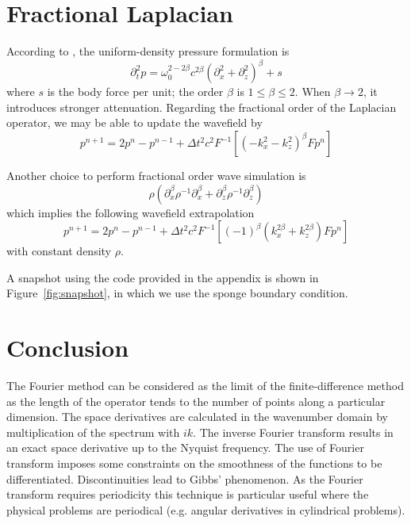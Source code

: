\section{Fractional Laplacian}

According to \cite{Carcione_2010_GFP}, the uniform-density pressure formulation is 
\begin{equation}
 \partial_t^2p =\omega_0^{2-2\beta} c^{2\beta} (\partial_x^2+\partial_z^2)^\beta+s
\end{equation}
where $s$ is the body force per unit; the order $\beta$ is $1\leq \beta\leq 2$. When $\beta\rightarrow 2$, it introduces stronger attenuation. Regarding the fractional order of the Laplacian operator,
we may be able to update the wavefield by
\begin{equation}
p^{n+1}=2p^n-p^{n-1}+\Delta t^2 c^2F^{-1}[(-k_x^2-k_z^2)^\beta F p^n]
\end{equation}



Another choice to perform fractional order wave simulation is
\begin{equation}
 \rho (\partial_x^\beta \rho^{-1}\partial_x^\beta +\partial_z^\beta\rho^{-1}\partial_z^\beta )
\end{equation}
which implies the following wavefield extrapolation
\begin{equation}
p^{n+1}=2p^n-p^{n-1}+\Delta t^2 c^2F^{-1}[(-1)^\beta(k_x^{2\beta}+k_z^{2\beta}) F p^n]
\end{equation}
with constant density $\rho$.

A snapshot using the code provided in the appendix is shown in Figure~\ref{fig:snapshot}, in which we use the sponge boundary condition.



\section{Conclusion}
The Fourier method can be considered as the limit of the finite-difference
method as the length of the operator tends to the number of points along
a particular dimension.
The space derivatives are calculated in the wavenumber domain by
multiplication of the spectrum with $ik$. The inverse Fourier transform
results in an exact space derivative up to the Nyquist frequency.
The use of Fourier transform imposes some constraints on the
smoothness of the functions to be differentiated. Discontinuities lead to
Gibbs' phenomenon. As the Fourier transform requires periodicity this technique is particular useful where the physical problems are periodical (e.g. angular
derivatives in cylindrical problems).


